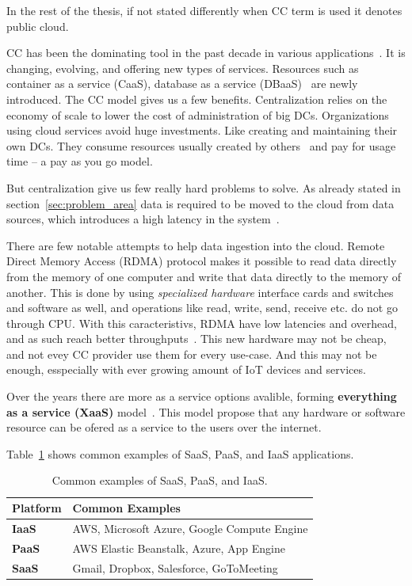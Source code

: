 In the rest of the thesis, if not stated differently when CC term is used it denotes public cloud.

CC has been the dominating tool in the past decade in various applications~\cite{Satyanarayanan17}. It is changing, evolving, and offering new types of services. Resources such as container as a service (CaaS), database as a service (DBaaS)~\cite{Peter} are newly introduced. The CC model gives us a few benefits. Centralization relies on the economy of scale to lower the cost of administration of big DCs. Organizations using cloud services avoid huge investments. Like creating and maintaining their own DCs. They consume resources usually created by others~\cite{Satyanarayanan17} and pay for usage time -- a pay as you go model. 

But centralization give us few really hard problems to solve. As already stated in section~\ref{sec:problem_area} data is required to be moved to the cloud from data sources, which introduces a high latency in the system~\cite{HossainRH18}. 

There are few notable attempts to help data ingestion into the cloud. Remote Direct Memory Access (RDMA) protocol makes it possible to read data directly from the memory of one computer and write that data directly to the memory of another. This is done by using \textit{specialized hardware} interface cards and switches and software as well, and operations like read, write, send, receive etc. do not go through CPU. With this caracteristivs, RDMA have low latencies and overhead, and as such reach better throughputs~\cite{CohenTKCKRCDG09}. This new hardware may not be cheap, and not evey CC provider use them for every use-case. And this may not be enough, esspecially with ever growing amount of IoT devices and services.

Over the years there are more as a service options avalible, forming \textbf{everything as a service (XaaS)} model~\cite{DuanFZSNH15}. This model propose that any hardware or software resource can be ofered as a service to the users over the internet.

Table~\ref{tab:table2} shows common examples of SaaS, PaaS, and IaaS applications.

\begin{table}[h!]
	\begin{center}
		\begin{tabular}{l|l}
			\textbf{Platform} & \textbf{Common Examples}\\
			\hline
			\textbf{IaaS} & AWS, Microsoft Azure, Google Compute Engine \\
			\textbf{PaaS} & AWS Elastic Beanstalk, Azure, App Engine \\
			\textbf{SaaS} & Gmail, Dropbox, Salesforce, GoToMeeting \\
		\end{tabular}
	\end{center}
	\vspace{-0.5cm}
	\caption{Common examples of SaaS, PaaS, and IaaS.}
	\label{tab:table2}
\end{table}

